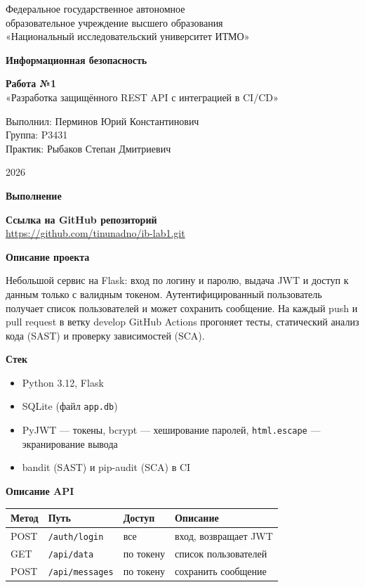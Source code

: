 \documentclass[14pt,a4paper]{extarticle}
\newcommand{\head}[1]{%
  \par\vspace{0.9em}%
  \noindent\textbf{#1}\par\vspace{0.35em}%
}
\begin{document}
\begin{titlepage}
\centering
Федеральное государственное автономное\\
образовательное учреждение высшего образования\\
«Национальный исследовательский университет ИТМО»

\vspace{3.2cm}
\textbf{Информационная безопасность}

\vspace{0.9cm}
\textbf{Работа №1}\\[0.35em]
«Разработка защищённого REST API с интеграцией в CI/CD»

\vspace{3.4cm}
\begin{flushright}
Выполнил: Перминов Юрий Константинович\\
Группа: P3431\\
Практик: Рыбаков Степан Дмитриевич
\end{flushright}

\vfill
2026
\end{titlepage}

\head{Выполнение}

\noindent\textbf{Ссылка на GitHub репозиторий}\\
\url{https://github.com/tinunadno/ib-lab1.git}

\head{Описание проекта}

Небольшой сервис на Flask: вход по логину и паролю, выдача JWT и доступ к данным только с валидным токеном. Аутентифицированный пользователь получает список пользователей и может сохранить сообщение. На каждый push и pull request в ветку develop GitHub Actions прогоняет тесты, статический анализ кода (SAST) и проверку зависимостей (SCA).

\head{Стек}

\begin{itemize}
  \item Python 3.12, Flask
  \item SQLite (файл \texttt{app.db})
  \item PyJWT --- токены, bcrypt --- хеширование паролей, \texttt{html.escape} --- экранирование вывода
  \item bandit (SAST) и pip-audit (SCA) в CI
\end{itemize}

\head{Описание API}

\begin{center}
\renewcommand{\arraystretch}{1.25}
\begin{tabular}{|l|l|l|p{5.6cm}|}
\hline
Метод & Путь & Доступ & Описание \\
\hline
POST & \texttt{/auth/login} & все & вход, возвращает JWT \\
\hline
GET & \texttt{/api/data} & по токену & список пользователей \\
\hline
POST & \texttt{/api/messages} & по токену & сохранить сообщение \\
\hline
\end{tabular}
\end{center}
\end{document}
